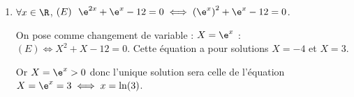 \begin{enumerate}
Nous savons que : $\displaystyle\lim\limits_{x \rightarrow +\infty} \dfrac{\ln(x)}{x^2}= 0$ (croissances comparées) et
$\displaystyle\lim\limits_{x \rightarrow +\infty} 1+ \dfrac{1}{3x^2}= 1$

donc $\displaystyle\lim\limits_{x \rightarrow +\infty} f(x)= 0$ \hfill {}
\item $\forall x \in \R$,  $(E)~~\e^{2x}+\e^x-12=0 \iff \left(\e^x\right)^2+\e^x-12=0$.

On pose comme changement de variable : $X=\e^x$ : $(E) \iff X^2+X-12=0$. Cette équation a pour solutions $X=-4$ et $X= 3$.

Or $X=\e^x>0$ donc l'unique solution sera celle de l'équation $X=\e^x=3\iff x=\ln(3)$. \hfill {}
\end{enumerate}
